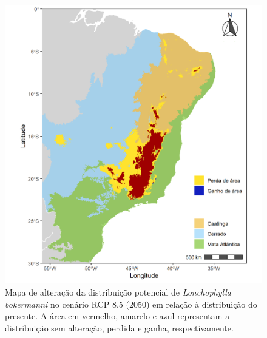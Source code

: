 \documentclass[
  11pt,
]{article}
\begin{document}
\begin{figure}
\centering
\includegraphics[width=1\textwidth,height=\textheight]{../Graficos/L_bokermanni_mapas_feitos/alteracao_RCP85.jpeg}
\caption{Mapa de alteração da distribuição potencial de
\emph{Lonchophylla bokermanni} no cenário RCP 8.5 (2050) em relação à
distribuição do presente. A área em vermelho, amarelo e azul representam
a distribuição sem alteração, perdida e ganha, respectivamente.}
\end{figure}
\end{document}
